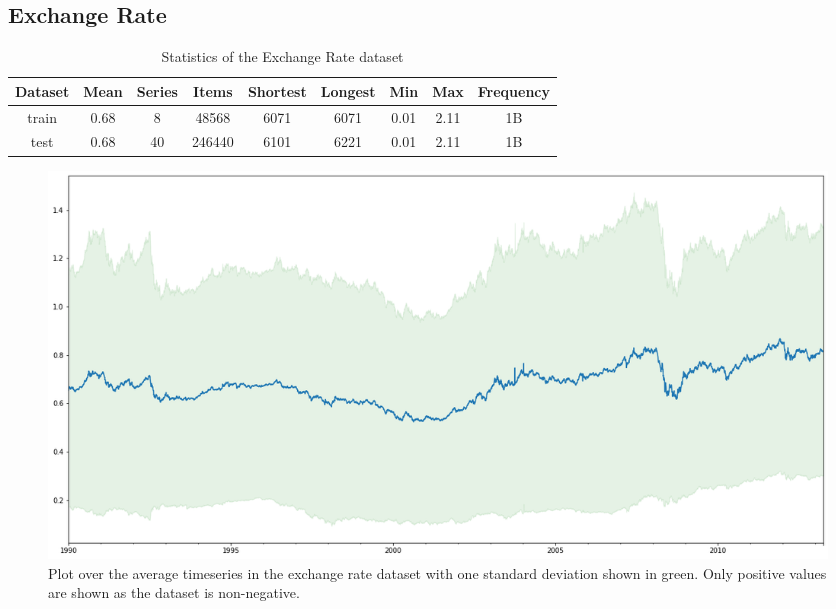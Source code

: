 \clearpage
\subsection{Exchange Rate}

\begin{table}[htb]
    \begin{tabular}{||c | c c c c c c c c ||} 
        \hline
        Dataset & Mean & Series & Items & Shortest & Longest & Min & Max & Frequency\\ [0.5ex] 
        \hline\hline
        train & 0.68 & 8 & 48568 & 6071 & 6071 & 0.01 & 2.11 & 1B\\ 
        \hline
        test & 0.68 & 40 & 246440 & 6101 & 6221 & 0.01 & 2.11 & 1B\\
        \hline
    \end{tabular}
    \caption{Statistics of the Exchange Rate dataset}
\end{table}

\begin{figure}[htb]
    \centering
      \includegraphics[width=\linewidth]{4_designing/figures/exchange_rate_plot.png}
      \caption{Plot over the average timeseries in the exchange rate dataset with one standard deviation shown in green. Only positive values are shown as the dataset is non-negative.}
      \label{fig:exchange_rate_plot}
    \endminipage\hfill
\end{figure}

